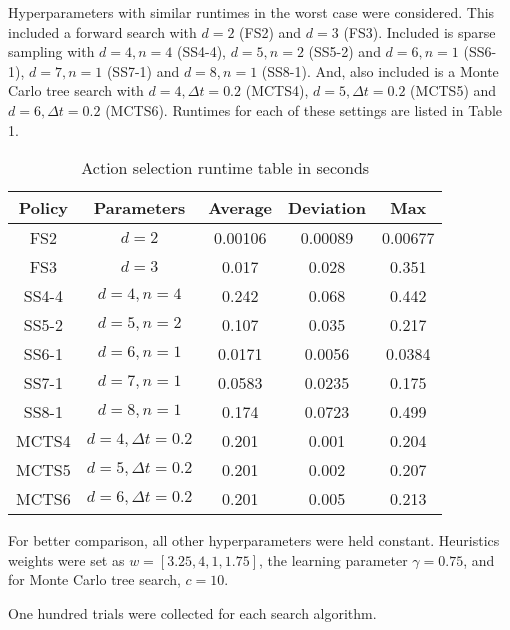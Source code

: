 \documentclass[conference]{IEEEtran}
\begin{document}
Hyperparameters with similar runtimes in the worst case were considered. This included a forward search with $d=2$ (FS2) and $d=3$ (FS3). Included is sparse sampling with $d=4, n=4$ (SS4-4), $d=5, n=2$ (SS5-2) and $d=6, n=1$ (SS6-1), $d=7, n=1$ (SS7-1) and $d=8, n=1$ (SS8-1). And, also included is a Monte Carlo tree search with $d=4, \Delta t = 0.2$ (MCTS4), $d=5, \Delta t = 0.2$ (MCTS5) and $d=6, \Delta t = 0.2$ (MCTS6). Runtimes for each of these settings are listed in Table 1.
\begin{table}[htbp]
	\caption{Action selection runtime table in seconds}
	\begin{center}
		\begin{tabular}{|c||c|c|c|c|}
			\hline
			Policy & Parameters & Average & Deviation & Max \\
			\hline\hline
			FS2 & $d=2$ &0.00106 & 0.00089 & 0.00677 \\
			\hline
			FS3    &   $d=3$            & 0.017    & 0.028 & 0.351   \\
			\hline
			SS4-4  & $d=4,n=4$          & 0.242    & 0.068 & 0.442              \\
			\hline
			SS5-2  & $d=5,n=2$          & 0.107    & 0.035 & 0.217              \\
			\hline
			SS6-1  & $d=6,n=1$          & 0.0171   & 0.0056 & 0.0384              \\
			\hline
			SS7-1  & $d=7,n=1$          & 0.0583   & 0.0235 & 0.175             \\
			\hline
			SS8-1  & $d=8,n=1$          & 0.174    & 0.0723 & 0.499              \\
			\hline
			MCTS4  & $d=4,\Delta t=0.2$ & 0.201    & 0.001 & 0.204             \\
			\hline
			MCTS5  & $d=5,\Delta t=0.2$ & 0.201    & 0.002 & 0.207             \\
			\hline
			MCTS6  & $d=6,\Delta t=0.2$ & 0.201    & 0.005 & 0.213             \\
			\hline
		\end{tabular}
		\label{tab1}
	\end{center}
\end{table}

For better comparison, all other hyperparameters were held constant. Heuristics weights were set as $w = [3.25,4,1,1.75]$, the learning parameter $\gamma = 0.75$, and for Monte Carlo tree search, $c = 10.$

One hundred trials were collected for each search algorithm.
\end{document}
